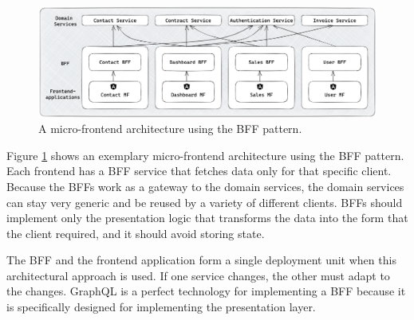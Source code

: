 \ifshowImages
\begin{figure}[H]
  \centering
  \includegraphics[width=0.9\linewidth]{images/background/micro-frontends/bff-architecture.png}
  \caption{A micro-frontend architecture using the \ac{BFF} pattern.}\label{fig:background:micro-frontend:bff-architecture}
\end{figure}
\fi

\noindent Figure \ref{fig:background:micro-frontend:bff-architecture} shows an exemplary micro-frontend architecture using the \ac{BFF} pattern. Each frontend has a \ac{BFF} service that fetches data only for that specific client. Because the \acp{BFF} work as a gateway to the domain services, the domain services can stay very generic and be reused by a variety of different clients. \acp{BFF} should implement only the presentation logic that transforms the data into the form that the client required, and it should avoid storing state. \cite{misc:2019:leitner:background:micro-frontends:backend-for-frontends}
\bigskip

\noindent The \ac{BFF} and the frontend application form a single deployment unit when this architectural approach is used. If one service changes, the other must adapt to the changes. GraphQL is a perfect technology for implementing a \ac{BFF} because it is specifically designed for implementing the presentation layer.
